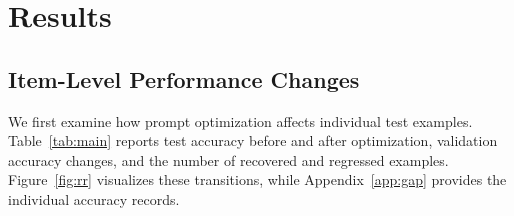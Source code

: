 \documentclass[10pt]{article} %
\begin{document}
\section{Results}
\label{sec:results}

\subsection{Item-Level Performance Changes}
\label{sec:itemresults}

We first examine how prompt optimization affects individual test examples. Table~\ref{tab:main} reports test accuracy before and after optimization, validation accuracy changes, and the number of recovered and regressed examples. Figure~\ref{fig:rr} visualizes these transitions, while Appendix~\ref{app:gap} provides the individual accuracy records.
\end{document}
